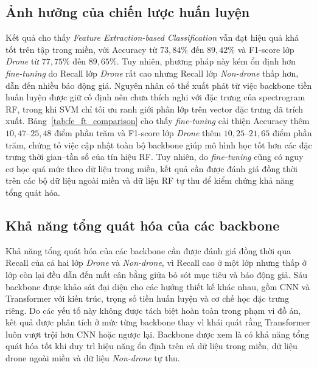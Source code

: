 \documentclass[../DoAn.tex]{subfiles}
\begin{document}
\subsection{Ảnh hưởng của chiến lược huấn luyện}

Kết quả cho thấy \textit{Feature Extraction-based Classification} vẫn đạt hiệu quả khá tốt trên tập trong miền, với Accuracy từ $73{,}84\%$ đến $89{,}42\%$ và F1-score lớp \textit{Drone} từ $77{,}75\%$ đến $89{,}65\%$. Tuy nhiên, phương pháp này kém ổn định hơn \textit{fine-tuning} do Recall lớp \textit{Drone} rất cao nhưng Recall lớp \textit{Non-drone} thấp hơn, dẫn đến nhiều báo động giả. Nguyên nhân có thể xuất phát từ việc backbone tiền huấn luyện được giữ cố định nên chưa thích nghi với đặc trưng của spectrogram RF, trong khi SVM chỉ tối ưu ranh giới phân lớp trên vector đặc trưng đã trích xuất. Bảng~\ref{tab:fe_ft_comparison} cho thấy \textit{fine-tuning} cải thiện Accuracy thêm $10{,}47$--$25{,}48$ điểm phần trăm và F1-score lớp \textit{Drone} thêm $10{,}25$--$21{,}65$ điểm phần trăm, chứng tỏ việc cập nhật toàn bộ backbone giúp mô hình học tốt hơn các đặc trưng thời gian--tần số của tín hiệu RF. Tuy nhiên, do \textit{fine-tuning} cũng có nguy cơ học quá mức theo dữ liệu trong miền, kết quả cần được đánh giá đồng thời trên các bộ dữ liệu ngoài miền và dữ liệu RF tự thu để kiểm chứng khả năng tổng quát hóa.

\subsection{Khả năng tổng quát hóa của các backbone}
Khả năng tổng quát hóa của các backbone cần được đánh giá đồng thời qua Recall của cả hai lớp \textit{Drone} và \textit{Non-drone}, vì Recall cao ở một lớp nhưng thấp ở lớp còn lại đều dẫn đến mất cân bằng giữa bỏ sót mục tiêu và báo động giả. Sáu backbone được khảo sát đại diện cho các hướng thiết kế khác nhau, gồm CNN và Transformer với kiến trúc, trọng số tiền huấn luyện và cơ chế học đặc trưng riêng. Do các yếu tố này không được tách biệt hoàn toàn trong phạm vi đồ án, kết quả được phân tích ở mức từng backbone thay vì khái quát rằng Transformer luôn vượt trội hơn CNN hoặc ngược lại. Backbone được xem là có khả năng tổng quát hóa tốt khi duy trì hiệu năng ổn định trên cả dữ liệu trong miền, dữ liệu drone ngoài miền và dữ liệu \textit{Non-drone} tự thu.
\end{document}
